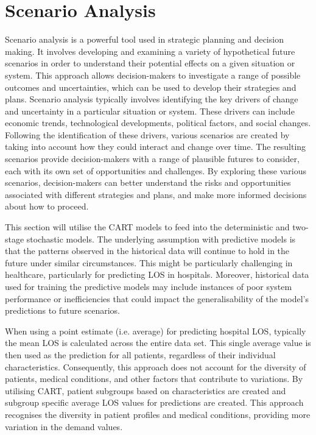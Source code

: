 \documentclass[../thesis.tex]{subfiles}
\begin{document}
\section{Scenario Analysis}\label{sec:scenarioanalysis}
Scenario analysis is a powerful tool used in strategic planning and decision making. It involves developing and examining a variety of hypothetical future scenarios in order to understand their potential effects on a given situation or system. This approach allows decision-makers to investigate a range of possible outcomes and uncertainties, which can be used to develop their strategies and plans. Scenario analysis typically involves identifying the key drivers of change and uncertainty in a particular situation or system. These drivers can include economic trends, technological developments, political factors, and social changes. Following the identification of these drivers, various scenarios are created by taking into account how they could interact and change over time. The resulting scenarios provide decision-makers with a range of plausible futures to consider, each with its own set of opportunities and challenges. By exploring these various scenarios, decision-makers can better understand the risks and opportunities associated with different strategies and plans, and make more informed decisions about how to proceed.

This section will utilise the CART models to feed into the deterministic and two-stage stochastic models. The underlying assumption with predictive models is that the patterns observed in the historical data will continue to hold in the future under similar circumstances. This might be particularly challenging in healthcare, particularly for predicting LOS in hospitals. Moreover, historical data used for training the predictive models may include instances of poor system performance or inefficiencies that could impact the generalisability of the model's predictions to future scenarios.

When using a point estimate (i.e. average) for predicting hospital LOS, typically the mean LOS is calculated across the entire data set. This single average value is then used as the prediction for all patients, regardless of their individual characteristics. Consequently, this approach does not account for the diversity of patients, medical conditions, and other factors that contribute to variations. By utilising CART, patient subgroups based on characteristics are created and subgroup specific average LOS values for predictions are created. This approach recognises the diversity in patient profiles and medical conditions, providing more variation in the demand values.
\end{document}
